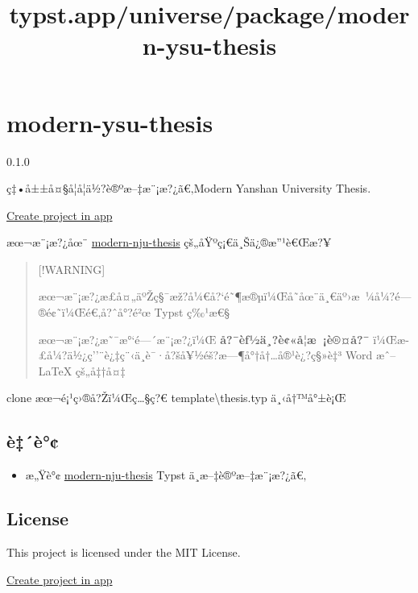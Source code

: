 \title{typst.app/universe/package/modern-ysu-thesis}

\label{banner}
\label{template-thumbnail}

\section{modern-ysu-thesis}\label{modern-ysu-thesis}

{ 0.1.0 }

ç‡•å±±å¤§å­¦å­¦ä½?è®ºæ--‡æ¨¡æ?¿ã€‚Modern Yanshan University Thesis.

\href{/app?template=modern-ysu-thesis&version=0.1.0}{Create project in
app}

\label{readme}
æœ¬æ¨¡æ?¿åœ¨
\href{https://github.com/nju-lug/modern-nju-thesis}{modern-nju-thesis}
çš„åŸºç¡€ä¸Šä¿®æ''¹è€Œæ?¥

\begin{quote}
{[}!WARNING{]}

æœ¬æ¨¡æ?¿æ­£å¤„äºŽç§¯æž?å¼€å?{}`é˜¶æ®µï¼Œå­˜åœ¨ä¸€äº›æ~¼å¼?é---®é¢˜ï¼Œé€‚å?ˆå°?é²œ
Typst ç‰¹æ€§

æœ¬æ¨¡æ?¿æ˜¯æ°`é---´æ¨¡æ?¿ï¼Œ \textbf{å?¯èƒ½ä¸?è¢«å­¦æ~¡è®¤å?¯}
ï¼Œæ­£å¼?ä½¿ç''¨è¿‡ç¨‹ä¸­è¯·å?šå¥½éš?æ---¶å°†å†\ldots å®¹è¿?ç§»è‡³ Word
æˆ-- LaTeX çš„å‡†å¤‡
\end{quote}

clone æœ¬é¡¹ç›®å?Žï¼Œç\ldots§ç?€ template\textbackslash thesis.typ
ä¸‹å†™å°±è¡Œ

\subsection{è‡´è°¢}\label{uxe8uxe8}

\begin{itemize}
\tightlist
\item
  æ„Ÿè°¢
  \href{https://github.com/nju-lug/modern-nju-thesis}{modern-nju-thesis}
  Typst ä¸­æ--‡è®ºæ--‡æ¨¡æ?¿ã€‚
\end{itemize}

\subsection{License}\label{license}

This project is licensed under the MIT License.

\href{/app?template=modern-ysu-thesis&version=0.1.0}{Create project in
app}

